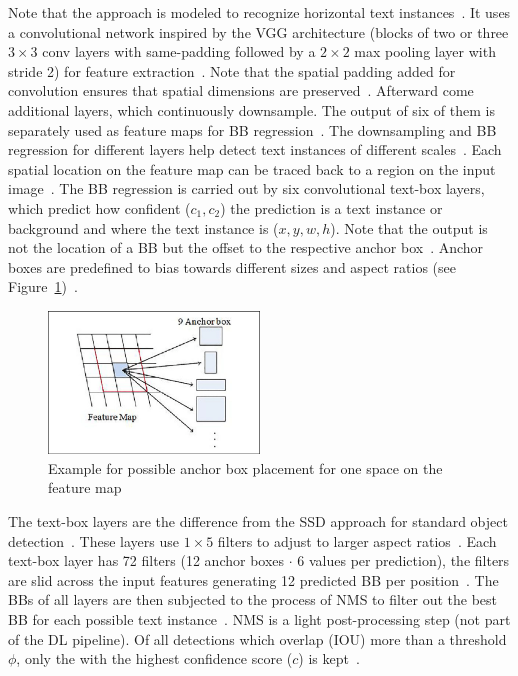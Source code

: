 Note that the approach is modeled to recognize horizontal text instances~\citep{liao_textboxes_2017}.
It uses a convolutional network inspired by the VGG architecture (blocks of two or
three $3\times3$ conv layers with same-padding followed by a $2\times2$ max pooling layer with
stride 2) for feature extraction~\citep{liao_textboxes_2017,simonyan_very_2015}.
Note that the spatial padding added for convolution ensures that spatial dimensions are
preserved~\citep{simonyan_very_2015}.
Afterward come additional layers, which continuously downsample.
The output of six of them is separately used as feature maps for \ac{BB}
regression~\citep{liao_textboxes_2017}.
The downsampling and \ac{BB} regression for different layers help detect text instances of different
scales~\citep{liu_ssd_2016}.
Each spatial location on the feature map can be traced back to a region on the input
image~\citep{long_scene_2021}.
The \ac{BB} regression is carried out by six convolutional text-box layers, which predict how
confident ($c_1,c_2$) the prediction is a text instance or background and where the text instance
is ($x,y,w,h$).
Note that the output is not the location of a \ac{BB} but the offset to the
respective anchor box~\citep{liao_textboxes_2017,long_scene_2021}.
Anchor boxes are predefined to bias towards different sizes and aspect ratios (see
Figure~\ref{fig:STD-segfree-anchors})~\citep{liao_textboxes_2017}.
\begin{figure}[ht]
    \centering
    \includegraphics[width=0.5\textwidth]{img/STD-seg-free-anchor-boxes-Zhao-Novel-2018.png}
    \caption[Anchor box placement for one space on the feature map]{%
        Example for possible anchor box placement for one space on the feature
        map~\citep{zhao_novel_2018}\label{fig:STD-segfree-anchors}
    }
\end{figure}
The text-box layers are the difference from the \ac{SSD} approach for standard object
detection~\citep{liao_textboxes_2017,liu_ssd_2016}.
These layers use $1\times5$ filters to adjust to larger aspect ratios~\citep{liao_textboxes_2017}.
Each text-box layer has 72 filters (12 anchor boxes $\cdot$ 6 values per prediction), the filters
are slid across the input features generating 12 predicted \ac{BB} per
position~\citep{liao_textboxes_2017}.
The \acp{BB} of all layers are then subjected to the process of \ac{NMS} to filter out the best
\ac{BB} for each possible text instance~\citep{liao_textboxes_2017}.
\ac{NMS} is a light post-processing step (not part of the \ac{DL} pipeline).
Of all detections which overlap (\ac{IOU}) more than a threshold
$\phi$, only the with the highest confidence score ($c$) is kept~\citep{hosang_learning_2017}.


